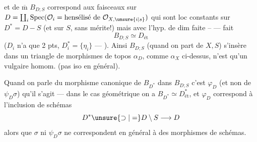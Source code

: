 et de $\overline{\mathrm m}$ $B_{D;S}$ correspond aux faisceaux sur $D=\coprod_i\operatorname{Spec}(\mathcal O_i=\text{hensélisé de }\mathcal O_{X,\unsure{i|s}})$  qui sont loc constants sur $D^*=D-S$ (et sur $S$, sans mérite!) mais avec l'hyp. de dim faite -- ---  fait
\[
 B_{D;S}\simeq D_{\text{ét}}
\]
($D_i$ n'a que 2 pts, $D_i^*=\{\eta_i\}$ --- ). Ainsi $B_{D;S}$ 
(quand on part de $X,S$) s'insère dans un triangle de morphismes de topos
$\alpha_D$, comme $\alpha_X$ ci-dessus, n'est qu'un vulgaire homom. (pas iso en général).

Quand on parle du morphisme canonique de $B_{D^*}$ dans $B_{D;S}$ c'est  $\varphi_D$ (et non de $\psi_D\sigma$) qu'il s'agit --- dans le cas géométrique on a $B_{D^*}\simeq D^*_{\text{ét}}$, et $\varphi_D$ correspond à l'inclusion de schémas
\[
 D^*\unsure{\supset|=}D\setminus S\longrightarrow D
\]
alors que $\sigma$ ni $\psi_D\sigma$ ne correspondent en général à des morphismes de schémas.

